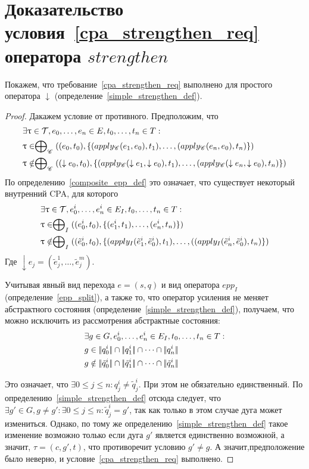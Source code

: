 \section{Доказательство условия~\ref{cpa_strengthen_req} оператора $strengthen$}
\label{sect_composite_strengthen_proof}

Покажем, что требование~\ref{cpa_strengthen_req} выполнено для простого оператора $\downarrow$ (определение~\ref{simple_strengthen_def}).

\begin{proof}
Дакажем условие от противного.
Предположим, что 
\begin{align*}
& \exists \uptau \in \mathcal{T}, e_0, \dots, e_n \in E, t_0, \dots, t_n \in T : \\
& \uptau \in \mathrel{\bigoplus}_{\mathscr{C}}((e_0, t_0), \{(apply_{\mathscr{C}}(e_1, e_0), t_1), \dots, (apply_{\mathscr{C}}(e_n, e_0), t_n)\}) \\
& \uptau \notin \mathrel{\bigoplus}_{\mathscr{C}}((\downarrow e_0, t_0), \{(apply_{\mathscr{C}}(\downarrow e_1, \downarrow e_0), t_1), \dots, (apply_{\mathscr{C}}(\downarrow e_n, \downarrow e_0), t_n)\}) 
\end{align*}
По определению~\ref{composite_epp_def} это означает, что существует некоторый внутренний CPA, для которого 
\begin{align*}
& \exists \uptau \in \mathcal{T}, e^i_0, \dots, e^i_n \in E_I, t_0, \dots, t_n \in T : \\
& \uptau \in \mathrel{\bigoplus}_{I}((e^i_0, t_0), \{(e^i_1, t_1), \dots, (e^i_n, t_n)\}) \\
& \uptau \notin \mathrel{\bigoplus}_{I}((\tilde{e}^i_0, t_0), \{(apply_{I}(\tilde{e}^i_1, \tilde{e}^i_0), t_1), \dots, ((apply_{I}(\tilde{e}^i_n, \tilde{e}^i_0), t_n)\}) 
\end{align*}
Где $\downarrow e_j = (\tilde{e}^1_j, \dots, \tilde{e}^m_j)$.

Учитывая явный вид перехода $e=(s,q)$ и вид оператора $epp_I$(определение~\ref{epp_split}), а также то, что оператор усиления не меняет абстрактного состояния (определение~\ref{simple_strengthen_def}), получаем, что можно исключить из рассмотрения абстрактные состояния:
\begin{align*}
& \exists g \in G, e^i_0, \dots, e^i_n \in E_I, t_0, \dots, t_n \in T : \\
& g \in \econc{q^i_0} \cap \econc{q^i_1} \cap \dots \cap \econc{q^i_n} \\
& g \notin \econc{\tilde{q}^i_0} \cap \econc{\tilde{q}^i_1} \cap \dots \cap \econc{\tilde{q}^i_n} 
\end{align*}

Это означает, что $\exists 0 \le j \le n: q^i_j \neq \tilde{q}^i_j$. При этом не обязательно единственный.
По определению~\ref{simple_strengthen_def} отсюда следует, что $\exists g' \in G, g \neq g': \exists 0 \le j \le n: \tilde{q}^i_j = g'$, так как только в этом случае дуга может измениться.
Однако, по тому же определению~\ref{simple_strengthen_def} такое изменение возможно только если дуга $g'$ является единственно возможной, а значит, $\tau = (c, g', t)$, что противоречит условию $g' \neq g$. 
А значит,предположение было неверно, и условие~\ref{cpa_strengthen_req} выполнено.
\end{proof}

